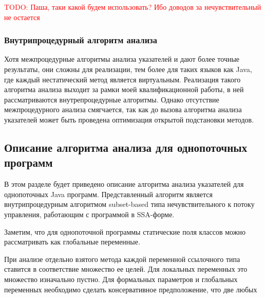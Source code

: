 \documentclass[14pt,titlepage]{extarticle}
\newcommand{\todo}[1]{\textcolor{red}{TODO: #1}}
\newcommand{\eng}[1]{{\English#1}}
\begin{document}
      \todo{Паша, таки какой будем использовать? Ибо доводов за
      нечувствительный не остается}

    \subsubsection{Внутрипроцедурный алгоритм анализа}

      Хотя межпроцедурные алгоритмы анализа указателей и дают более точные
      результаты, они сложны для реализации, тем более для таких
      языков как Java, где каждый нестатический метод является виртуальным.
      Реализация такого алгоритма анализа выходит за рамки моей
      квалификационной работы, в ней рассматриваются внутрепроцедурные
      алгоритмы. Однако отсутствие межпроцедурного анализа смягчается, так
      как до вызова алгоритма анализа указателей может быть проведена
      оптимизация открытой подстановки методов.

    \subsection{Описание алгоритма анализа для однопоточных программ}

      В этом разделе будет приведено описание алгоритма анализа указателей
      для однопоточных Java программ.
      Представленный алгоритм является внутрипроцедурным алгоритмом
      \eng{subset-based} типа нечувствительного к потоку управления,
      работающим с программой в SSA-форме.

      Заметим, что для однопоточной программы статические поля классов можно
      рассматривать как глобальные переменные.

      При анализе отдельно взятого метода каждой переменной ссылочного типа
      ставится в соответствие множество ее целей. Для локальных переменных
      это множество изначально пустно. Для формальных параметров и глобальных
      переменных необходимо сделать консервативное предположение, что две любых
\end{document}
